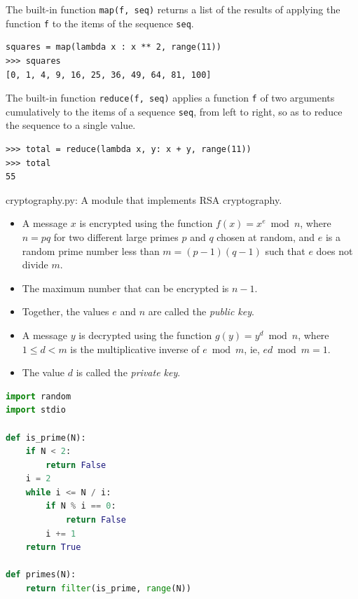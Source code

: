 \documentclass[8pt,a4paper,compress,handout]{beamer}
\begin{document}
\begin{frame}[fragile]
The built-in function \lstinline{map(f, seq)} returns a list of the results of applying the function \lstinline{f} to the items of the sequence \lstinline{seq}.
\begin{lstlisting}[language={}]
squares = map(lambda x : x ** 2, range(11))
>>> squares
[0, 1, 4, 9, 16, 25, 36, 49, 64, 81, 100]
\end{lstlisting}

\bigskip

The built-in function \lstinline{reduce(f, seq)} applies a function \lstinline{f} of two arguments cumulatively to the items of a sequence \lstinline{seq}, from left to right, so as to reduce the sequence to a single value.
\begin{lstlisting}[language={}]
>>> total = reduce(lambda x, y: x + y, range(11))
>>> total
55
\end{lstlisting}
\end{frame}

\begin{frame}[fragile]
\begin{framed}
\tiny cryptography.py: A module that implements RSA cryptography.
\begin{itemize}

\item A message $x$ is encrypted using the function $f(x) = x^e \bmod n$, where $n=pq$ for two different large primes $p$ and $q$ chosen at random, and $e$ is a random prime number less than $m=(p-1)(q-1)$ such that $e$ does not divide $m$. 

\item The maximum number that can be encrypted is $n-1$.

\item Together, the values $e$ and $n$ are called the \emph{public key}.

\item A message $y$ is decrypted using the function $g(y) = y^d \bmod n$, where $1 \leq d < m$ is the multiplicative inverse of $e \bmod m$, ie, $ed \bmod m = 1$.

\item The value $d$ is called the \emph{private key}.
\end{itemize}
\end{framed}
\begin{lstlisting}[language=Python]
import random
import stdio

def is_prime(N):
    if N < 2: 
        return False
    i = 2
    while i <= N / i:
        if N % i == 0:
            return False
        i += 1
    return True

def primes(N):
    return filter(is_prime, range(N))
\end{lstlisting}
\end{frame}
\end{document}
